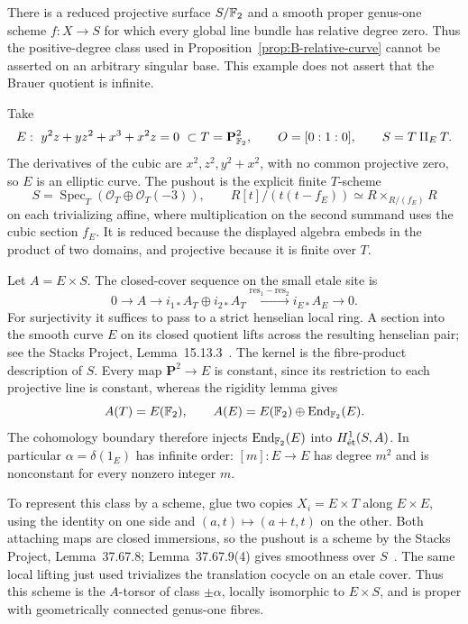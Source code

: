 \begin{example}
\label{ex:B-singular-infinite-period}
There is a reduced projective surface \(S/\mathbb F_2\) and a smooth
proper genus-one scheme \(f:X\to S\) for which every global line
bundle has relative degree zero.  Thus the positive-degree class
used in Proposition~\ref{prop:B-relative-curve} cannot be asserted
on an arbitrary singular base.  This example does not assert that
the Brauer quotient is infinite.

Take
\[
 E:\ y^2z+yz^2+x^3+x^2z=0\ \subset T=\mathbf P^2_{\mathbb F_2},
 \qquad O=[0:1:0],
 \qquad S=T\amalg_E T.
\]
The derivatives of the cubic are \(x^2,z^2,y^2+x^2\), with no
common projective zero, so \(E\) is an elliptic curve.  The
pushout is the explicit finite \(T\)-scheme
\[
 S=\operatorname{Spec}_T(\mathcal O_T\oplus\mathcal O_T(-3)),
 \qquad
 R[t]/(t(t-f_E))\simeq R\times_{R/(f_E)}R
\]
on each trivializing affine, where multiplication on the second
summand uses the cubic section \(f_E\).  It is reduced because
the displayed algebra embeds in the product of two domains, and
projective because it is finite over \(T\).

Let \(A=E\times S\).  The closed-cover sequence on the small
etale site is
\[
 0\longrightarrow A\longrightarrow i_{1*}A_T\oplus i_{2*}A_T
 \xrightarrow{\mathrm{res}_1-\mathrm{res}_2}i_{E*}A_E
 \longrightarrow0.
\]
For surjectivity it suffices to pass to a strict henselian local
ring.  A section into the smooth curve \(E\) on its closed
quotient lifts across the resulting henselian pair; see the Stacks
Project, Lemma~15.13.3~\cite{BStacksSmoothLift}.  The kernel is
the fibre-product description of \(S\).  Every map
\(\mathbf P^2\to E\) is constant, since its restriction to
each projective line is constant, whereas the rigidity lemma gives
\[
 A(T)=E(\mathbb F_2),\qquad
 A(E)=E(\mathbb F_2)\oplus\operatorname{End}_{\mathbb F_2}(E).
\]
The cohomology boundary therefore injects
\(\operatorname{End}_{\mathbb F_2}(E)\) into \(H^1_{\mathrm{\acute et}}(S,A)\).
In particular \(\alpha=\delta(1_E)\) has infinite order:
\([m]:E\to E\) has degree \(m^2\) and is nonconstant for every
nonzero integer \(m\).

To represent this class by a scheme, glue two copies
\(X_i=E\times T\) along \(E\times E\), using the identity
on one side and \((a,t)\mapsto(a+t,t)\) on the other.
Both attaching maps are closed immersions, so the pushout is a
scheme by the Stacks Project, Lemma~37.67.8; Lemma~37.67.9(4)
gives smoothness over \(S\)~\cite{BStacksClosedPushout,BStacksPushoutMorphisms}.  The same local lifting just used
trivializes the translation cocycle on an etale cover.  Thus this
scheme is the \(A\)-torsor of class \(\pm\alpha\), locally
isomorphic to \(E\times S\), and is proper with geometrically
connected genus-one fibres.


\end{example}
